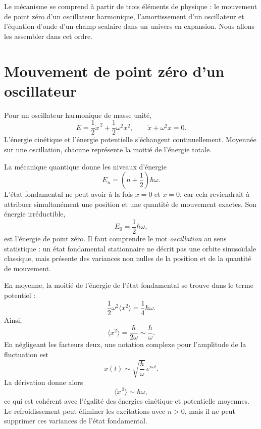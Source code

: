 Le mécanisme se comprend à partir de trois éléments de physique : le mouvement de point zéro d’un oscillateur harmonique, l’amortissement d’un oscillateur et l’équation d’onde d’un champ scalaire dans un univers en expansion. Nous allons les assembler dans cet ordre.

\section{Mouvement de point zéro d’un oscillateur}

Pour un oscillateur harmonique de masse unité,
\begin{equation}
E=\frac12\dot x^{\,2}+\frac12\omega^2x^2,
\qquad
\ddot x+\omega^2x=0.
\label{eq:c10-undamped}
\end{equation}
L’énergie cinétique et l’énergie potentielle s’échangent continuellement. Moyennée sur une oscillation, chacune représente la moitié de l’énergie totale.

La mécanique quantique donne les niveaux d’énergie
\begin{equation}
E_n=\left(n+\frac12\right)\hbar\omega.
\label{eq:c10-oscillator-levels}
\end{equation}
L’état fondamental ne peut avoir à la fois \(x=0\) et \(\dot x=0\), car cela reviendrait à attribuer simultanément une position et une quantité de mouvement exactes. Son énergie irréductible,
\[
E_0=\frac12\hbar\omega,
\]
est l’énergie de point zéro. Il faut comprendre le mot \emph{oscillation} au sens statistique : un état fondamental stationnaire ne décrit pas une orbite sinusoïdale classique, mais présente des variances non nulles de la position et de la quantité de mouvement.

En moyenne, la moitié de l’énergie de l’état fondamental se trouve dans le terme potentiel :
\[
\frac12\omega^2\langle x^2\rangle
=\frac14\hbar\omega.
\]
Ainsi,
\begin{equation}
\langle x^2\rangle=\frac{\hbar}{2\omega}
\sim\frac{\hbar}{\omega}.
\label{eq:c10-zero-point-position}
\end{equation}
En négligeant les facteurs deux, une notation complexe pour l’amplitude de la fluctuation est
\[
x(t)\sim\sqrt{\frac{\hbar}{\omega}}\,e^{i\omega t}.
\]
La dérivation donne alors
\begin{equation}
\langle\dot x^{\,2}\rangle\sim\hbar\omega,
\label{eq:c10-zero-point-velocity}
\end{equation}
ce qui est cohérent avec l’égalité des énergies cinétique et potentielle moyennes. Le refroidissement peut éliminer les excitations avec \(n>0\), mais il ne peut supprimer ces variances de l’état fondamental.

